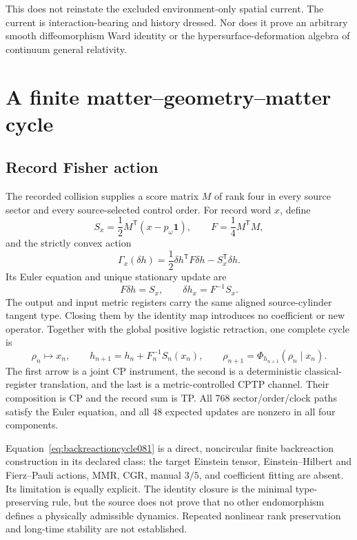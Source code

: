 \documentclass[11pt]{article}
\theoremstyle{definition}
\theoremstyle{remark}
\begin{document}
This does not reinstate the excluded environment-only spatial current. The current is interaction-bearing and history dressed. Nor does it prove an arbitrary smooth diffeomorphism Ward identity or the hypersurface-deformation algebra of continuum general relativity.

\section{A finite matter--geometry--matter cycle}\label{sec:finitebackreaction081}

\subsection{Record Fisher action}

The recorded collision supplies a score matrix $M$ of rank four in every source sector and every source-selected control order. For record word $x$, define
\begin{equation}
 S_x=\frac12M^{\mathsf T}(x-p_\omega\mathbf 1),
 \qquad
 F=\frac14M^{\mathsf T}M,
\end{equation}
and the strictly convex action
\begin{equation}\label{eq:fisheraction081}
 \Gamma_x(\delta h)
 =\frac12\delta h^{\mathsf T}F\delta h-S_x^{\mathsf T}\delta h.
\end{equation}
Its Euler equation and unique stationary update are
\begin{equation}\label{eq:fisherupdate081}
 F\delta h=S_x,
 \qquad
 \delta h_x=F^{-1}S_x.
\end{equation}
The output and input metric registers carry the same aligned source-cylinder tangent type. Closing them by the identity map introduces no coefficient or new operator. Together with the global positive logistic retraction, one complete cycle is
\begin{equation}\label{eq:backreactioncycle081}
 \rho_n\longmapsto x_n,
 \qquad
 h_{n+1}=h_n+F_n^{-1}S_n(x_n),
 \qquad
 \rho_{n+1}=\Phi_{h_{n+1}}(\rho_n\mid x_n).
\end{equation}
The first arrow is a joint CP instrument, the second is a deterministic classical-register translation, and the last is a metric-controlled CPTP channel. Their composition is CP and the record sum is TP. All 768 sector/order/clock paths satisfy the Euler equation, and all 48 expected updates are nonzero in all four components.

Equation~\eqref{eq:backreactioncycle081} is a direct, noncircular finite backreaction construction in its declared class: the target Einstein tensor, Einstein--Hilbert and Fierz--Pauli actions, MMR, CGR, manual $3/5$, and coefficient fitting are absent. Its limitation is equally explicit. The identity closure is the minimal type-preserving rule, but the source does not prove that no other endomorphism defines a physically admissible dynamics. Repeated nonlinear rank preservation and long-time stability are not established.
\end{document}

